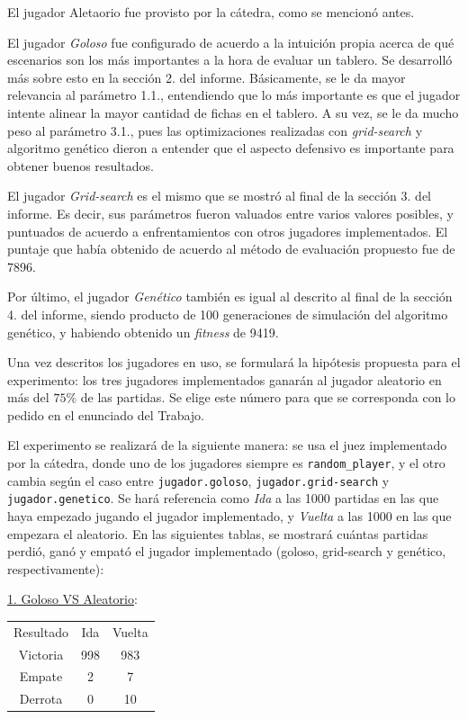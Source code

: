 \documentclass[12pt,a4paper]{article}
\begin{document}
    El jugador Aletaorio fue provisto por la cátedra, como se mencionó antes.
    
    El jugador \textit{Goloso} fue configurado de acuerdo a la intuición propia acerca de qué escenarios son los más importantes a la hora de evaluar un tablero. Se desarrolló más sobre esto en la sección 2. del informe. Básicamente, se le da mayor relevancia al parámetro 1.1., entendiendo que lo más importante es que el jugador intente alinear la mayor cantidad de fichas en el tablero. A su vez, se le da mucho peso al parámetro 3.1., pues las optimizaciones realizadas con \textit{grid-search} y algoritmo genético dieron a entender que el aspecto defensivo es importante para obtener buenos resultados.
    
    El jugador \textit{Grid-search} es el mismo que se mostró al final de la sección 3. del informe. Es decir, sus parámetros fueron valuados entre varios valores posibles, y puntuados de acuerdo a enfrentamientos con otros jugadores implementados. El puntaje que había obtenido de acuerdo al método de evaluación propuesto fue de 7896.
    
    Por último, el jugador \textit{Genético} también es igual al descrito al final de la sección 4. del informe, siendo producto de 100 generaciones de simulación del algoritmo genético, y habiendo obtenido un \textit{fitness} de 9419.
    
    Una vez descritos los jugadores en uso, se formulará la hipótesis propuesta para el experimento: los tres jugadores implementados ganarán al jugador aleatorio en más del $75\%$ de las partidas. Se elige este número para que se corresponda con lo pedido en el enunciado del Trabajo.
    
    El experimento se realizará de la siguiente manera: se usa el juez implementado por la cátedra, donde uno de los jugadores siempre es \texttt{random\_player}, y el otro cambia según el caso entre \texttt{jugador.goloso}, \texttt{jugador.grid-search} y \texttt{jugador.genetico}. Se hará referencia como \textit{Ida} a las 1000 partidas en las que haya empezado jugando el jugador implementado, y \textit{Vuelta} a las 1000 en las que empezara el aleatorio. En las siguientes tablas, se mostrará cuántas partidas perdió, ganó y empató el jugador implementado (goloso, grid-search y genético, respectivamente):

    \underline{1. Goloso VS Aleatorio}:
    \begin{center}
		\begin{tabular}{ | c || c | c | }
		\hline
		Resultado &  Ida &  Vuelta \\ \hhline{|=#=|=|}
		    Victoria &  998 &  983 \\ \hline
		    Empate &  2 &  7 \\ \hline
		    Derrota &  0 &  10 \\ \hline
		\end{tabular}
    \end{center}
    
\end{document}

